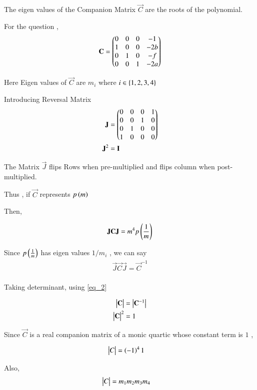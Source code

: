 \documentclass[journal]{IEEEtran}
\numberwithin{equation}{enumi}
\numberwithin{figure}{enumi}
\begin{document}
The eigen values of the Companion Matrix $\vec{C}$ are the roots of the polynomial.

For the question , 
\begin{align}
    \mathbf{C} = \begin{pmatrix}0&0&0&-1\\
                     1&0&0&-2b\\
                     0&1&0&-f\\
                     0&0&1&-2a\end{pmatrix}
\end{align}

Here Eigen values of $\vec{C}$ are $m_i$ where $i \in \left\{1,2,3,4\right\}$

Introducing Reversal Matrix 
\begin{align}
    \mathbf{J} &= \begin{pmatrix}0&0&0&1\\0&0&1&0\\0&1&0&0\\1&0&0&0\end{pmatrix} \\ 
    \mathbf{J}^2 &= \mathbf{I} \label{eq_2}
\end{align}

The Matrix $\vec{J}$ flips Rows when pre-multiplied and flips column when post-multiplied.

Thus , if $\vec{C}$ represents $p\left(m\right)$

Then,

\begin{align}
    \mathbf{J}\mathbf{C}\mathbf{J} = m^4p\left(\frac{1}{m}\right)
\end{align}

Since $p\left(\frac{1}{m}\right)$ has eigen values $1/m_i$ , we can say 
\begin{align}
    \vec{J}\vec{C}\vec{J} = \vec{C}^{-1} \\
\end{align}

Taking determinant, using \ref{eq_2}

\begin{align}
    \begin{vmatrix}\mathbf{C}\end{vmatrix} &= \begin{vmatrix}\mathbf{C}^{-1}\end{vmatrix}\\
    \begin{vmatrix}\mathbf{C}\end{vmatrix}^2 &= 1 
\end{align}

Since $\vec{C}$ is a real companion matrix of a monic quartic whose constant term is $1$ , 

\begin{align}
    \begin{vmatrix}C\end{vmatrix} &= \left(-1\right)^4 1 
\end{align}

Also, 
\begin{align}
    \begin{vmatrix}C\end{vmatrix} &= m_1m_2m_3m_4
\end{align}
\end{document}
